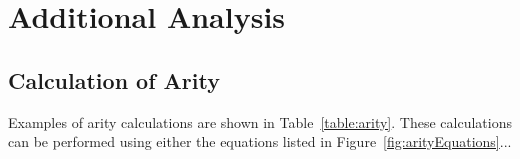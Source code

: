 \chapter{Additional Analysis}\label{App:Analysis}

\section{Calculation of Arity}\label{AppSec:arity}


    Examples of arity calculations are shown in Table~\vref{table:arity}.  These calculations
    can be performed using either the equations listed in
    Figure~\vref{fig:arityEquations}...

   \begin{singlespacing}
    \begin{figure}[h]
    \begin{boxedminipage}[h]{433pt}
        \begin{minipage}{400pt}


\end{minipage}
\end{boxedminipage}
\end{figure}
\end{singlespacing}
